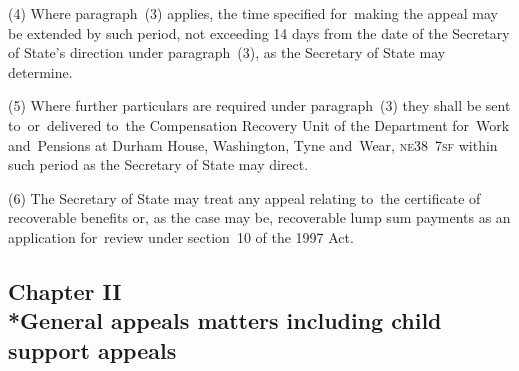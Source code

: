 \documentclass[12pt,a4paper]{article}
\begin{document}
(4) Where paragraph~(3) applies, the time specified for~making the appeal 
may be extended by such period, not exceeding 14 days from the date of the Secretary of State’s direction under paragraph~(3), as the Secretary of State may determine.

(5) Where further particulars 
are required under paragraph~(3) they shall be sent to~or~delivered to~the Compensation Recovery Unit of the 
Department for~Work and~Pensions  %
at 
Durham House, Washington, Tyne and~Wear, \textsc{\lowercase{NE38~7SF}}  %
within such period as the Secretary of State may direct.

(6) The Secretary of State may treat any appeal relating to~the certificate of recoverable benefits 
or, as the case may be, recoverable lump sum payments  %
as an application for~review under section~10 of the 1997 Act.


\subsection[Chapter II --- General appeals matters including child support appeals]{Chapter II\\*General appeals matters including child support appeals}
\end{document}
